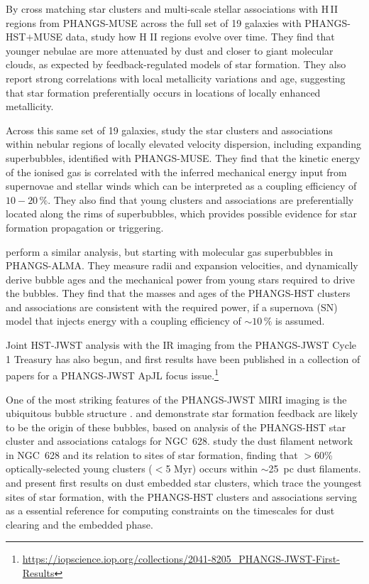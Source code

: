 \documentclass[linenumbers]{aastex63}
\begin{document}
By cross matching star clusters and multi-scale stellar associations with H\,II regions from PHANGS-MUSE across the full set of 19 galaxies with PHANGS-HST$+$MUSE data, \citet{scheuermann_stellar_2023} study how H II regions evolve over time.   They find that younger nebulae are more attenuated by dust and closer to giant molecular clouds, as expected by feedback-regulated models of star formation.  They also report strong correlations with local metallicity variations and age, suggesting that star formation preferentially occurs in locations of locally enhanced metallicity. 

Across this same set of 19 galaxies, \citet{egorov_quantifying_2023} study the star clusters and associations within nebular regions of locally elevated velocity dispersion, including expanding superbubbles, identified with PHANGS-MUSE.  They find that the kinetic energy of the ionised gas is correlated with the inferred mechanical energy input from supernovae and stellar winds which can be interpreted as a coupling efficiency of $10-20\,\%$. They also find that young clusters and associations are preferentially located along the rims of superbubbles, which provides possible evidence for star formation propagation or triggering. 

\citet{watkins_quantifying_2023} perform a similar analysis, but starting with molecular gas superbubbles in PHANGS-ALMA.  They measure radii and expansion velocities, and dynamically derive bubble ages and the mechanical power from young stars required to drive the bubbles. They find that the masses and ages of the PHANGS-HST clusters and associations are consistent with the required power, if a supernova (SN) model that injects energy with a coupling efficiency of $\sim10\,\%$ is assumed.  

Joint HST-JWST analysis with the IR imaging from the PHANGS-JWST Cycle 1 Treasury has also begun, and first results have been published in a collection of papers for a PHANGS-JWST ApJL focus issue.\footnote{\url{https://iopscience.iop.org/collections/2041-8205_PHANGS-JWST-First-Results}}  

One of the most striking features of the PHANGS-JWST MIRI imaging is the ubiquitous bubble structure \citep{lee_phangs-jwst_2023, williams_phangs-jwst_2024}. \citet{watkins_phangs-jwst_2023} and \citet{barnes_phangs-jwst_2023} demonstrate star formation feedback are likely to be the origin of these bubbles, based on analysis of the PHANGS-HST star cluster and associations catalogs for NGC~628.  \citet{thilker_phangs-jwst_2023} study the dust filament network in NGC~628 and its relation to sites of star formation, finding that $>$60\% optically-selected young clusters ($<$5 Myr) occurs within $\sim$25~pc dust filaments. \citet{rodriguez_phangs-jwst_2023} and \citet{whitmore_phangs-jwst_2023} present first results on dust embedded star clusters, which trace the youngest sites of star formation, with the PHANGS-HST clusters and associations serving as a essential reference for computing constraints on the timescales for dust clearing and the embedded phase.
\end{document}
